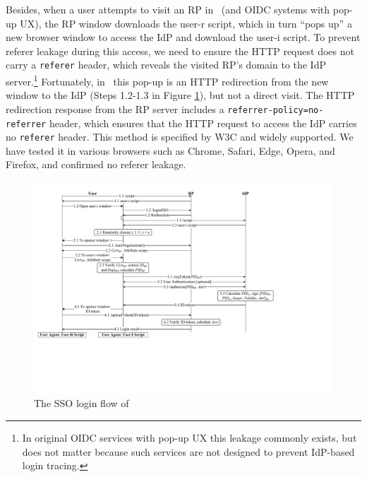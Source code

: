

Besides, when a user attempts to visit an RP in \usso\ (and OIDC systems with pop-up UX), the RP window downloads the user-r script, which in turn ``pops up'' a new browser window to access the IdP and download the user-i script.
To prevent referer leakage during this access, we need to ensure the HTTP request does not carry a \texttt{referer} header, which reveals the visited RP's domain to the IdP server.\footnote{In original OIDC services with pop-up UX this leakage commonly exists, but does not matter because such services are not designed to prevent IdP-based login tracing.} %
Fortunately, in \usso\ this pop-up is an HTTP redirection from the new window to the IdP (Steps 1.2-1.3 in Figure \ref{fig:process}), but not a direct visit.
The HTTP redirection response from the RP server includes a \texttt{referrer-policy=no-referrer} header, which ensures that the HTTP request to access the IdP carries no \texttt{referer} header.
This method is specified by W3C \cite{referer_policy} and widely supported. We have tested it in various browsers such as Chrome, Safari, Edge, Opera, and Firefox, and confirmed no referer leakage.

\begin{figure}[htb]
  \centering
  \includegraphics[height=0.491\textheight]{fig/process-js.pdf}
  \caption{The SSO login flow of \usso}
  \label{fig:process}
\end{figure}



